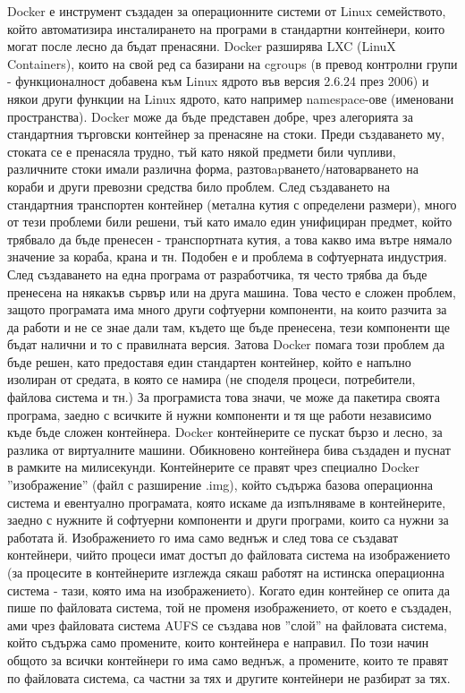 \documentclass[pdftex,14pt,a4paper]{extreport}
\begin{document}
Docker е инструмент създаден за операционните системи от Linux семейството, който автоматизира инсталирането на програми в стандартни контейнери, които могат после лесно да бъдат пренасяни. Docker разширява LXC (LinuX Containers), които на свой ред са базирани на cgroups (в превод контролни групи - функционалност добавена към Linux ядрото във версия 2.6.24 през 2006) и някои други функции на Linux ядрото, като например namespace-ове (именовани пространства). Docker може да бъде представен добре, чрез алегорията за стандартния търговски контейнер за пренасяне на стоки. Преди създаването му, стоката се е пренасяла трудно, тъй като някой предмети били чупливи, различните стоки имали различна форма, разтовapването/натоварването на кораби и други превозни средства било проблем. След създаването на стандартния транспортен контейнер (метална кутия с определени размери), много от тези проблеми били решени, тъй като имало един унифициран предмет, който трябвало да бъде пренесен - транспортната кутия, а това какво има вътре нямало значение за кораба, крана и тн. Подобен е и проблема в софтуерната индустрия. След създаването на една програма от разработчика, тя често трябва да бъде пренесена на някакъв сървър или на друга машина. Това често е сложен проблем, защото програмата има много други софтуерни компоненти, на които разчита за да работи и не се знае дали там, където ще бъде пренесена, тези компоненти ще бъдат налични и то с правилната версия. Затова Docker помага този проблем да бъде решен, като предоставя един стандартен контейнер, който е напълно изолиран от средата, в която се намира (не споделя процеси, потребители, файлова система и тн.) За програмиста това значи, че може да пакетира своята програма, заедно с всичките й нужни компоненти и тя ще работи независимо къде бъде сложен контейнера. Docker контейнерите се пускат бързо и лесно, за разлика от виртуалните машини. Обикновено контейнера бива създаден и пуснат в рамките на милисекунди. Контейнерите се правят чрез специално Docker ''изображение'' (файл с разширение .img), който съдържа базова операционна система и евентуално програмата, която искаме да изпълняваме в контейнерите, заедно с нужните й софтуерни компоненти и други програми, които са нужни за работата й. Изображението го има само веднъж и след това се създават контейнери, чийто процеси имат достъп до файловата система на изображението (за процесите в контейнерите изглежда сякаш работят на истинска операционна система - тази, която има на изображението). Когато един контейнер се опита да пише по файловата система, той не променя изображението, от което е създаден, ами чрез файловата система AUFS се създава нов ''слой'' на файловата система, който съдържа само промените, които контейнера е направил. По този начин общото за всички контейнери го има само веднъж, а промените, които те правят по файловата система, са частни за тях и другите контейнери не разбират за тях. 
\end{document}

